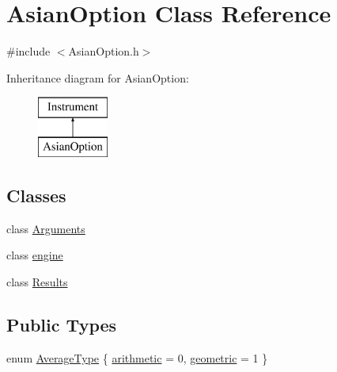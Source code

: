 \hypertarget{class_asian_option}{}\section{Asian\+Option Class Reference}
\label{class_asian_option}


{\ttfamily \#include $<$Asian\+Option.\+h$>$}

Inheritance diagram for Asian\+Option\+:\begin{figure}[H]
\begin{center}
\leavevmode
\includegraphics[height=2.000000cm]{class_asian_option}
\end{center}
\end{figure}
\subsection*{Classes}
\begin{DoxyCompactItemize}
\item 
class \hyperlink{class_asian_option_1_1_arguments}{Arguments}
\item 
class \hyperlink{class_asian_option_1_1engine}{engine}
\item 
class \hyperlink{class_asian_option_1_1_results}{Results}
\end{DoxyCompactItemize}
\subsection*{Public Types}
\begin{DoxyCompactItemize}
\item 
enum \hyperlink{class_asian_option_add7292791bf85820ff9fdbfd4407f3b9}{Average\+Type} \{ \hyperlink{class_asian_option_add7292791bf85820ff9fdbfd4407f3b9aff8fffb81d05144807269caa96d3b145}{arithmetic} = 0, 
\hyperlink{class_asian_option_add7292791bf85820ff9fdbfd4407f3b9a17b74dba78a6e25158da4eb685ecfa4e}{geometric} = 1
 \}
\end{DoxyCompactItemize}
